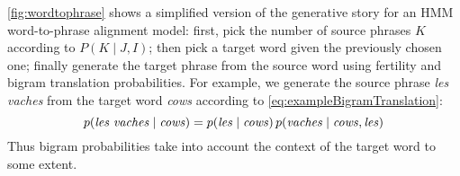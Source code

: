\autoref{fig:wordtophrase}
shows a simplified version of the generative story for an HMM word-to-phrase
alignment model: first, pick the number of source phrases $K$ according to
$P(K \mid J,I)$; then
pick a target word given the previously chosen one; finally generate the target
phrase from the source word using fertility and bigram translation probabilities.
For example, we generate the source phrase \emph{les vaches} from
the target word \emph{cows}
according to \autoref{eq:exampleBigramTranslation}:
%
\begin{equation}
  p(\text{\emph{les vaches}} \mid \text{\emph{cows}}) = p(\text{\emph{les}} \mid \text{\emph{cows}}) \, p(\text{\emph{vaches}} \mid \text{\emph{cows}}, \text{\emph{les}})
  \label{eq:exampleBigramTranslation}
\end{equation}
%
Thus bigram probabilities take into account the context of the target word to
some extent.
%
